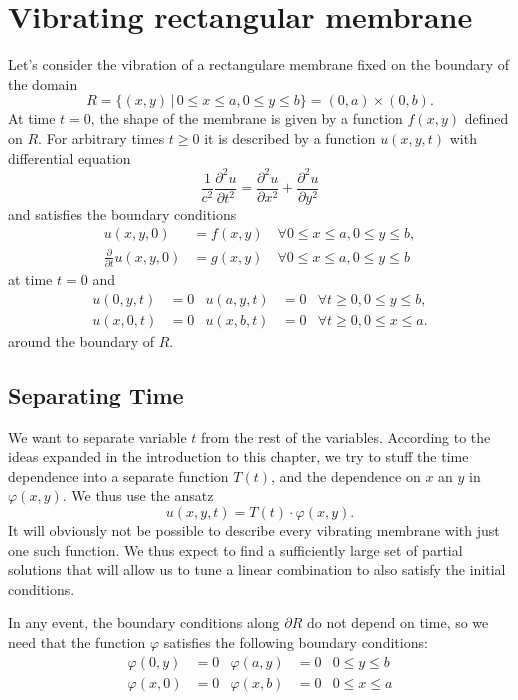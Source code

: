 %
%
%
\section{Vibrating rectangular membrane}
Let's consider the vibration of a rectangulare membrane fixed on
the boundary of the domain
\[
R=\{(x,y)\,|\,0\le x\le a,0\le y\le b\} =(0,a)\times(0,b).
\]
At time $t=0$, the shape of the membrane is given by a function
$f(x,y)$ defined on $R$.
For arbitrary times $t\ge 0$ it is described by a function $u(x,y,t)$ 
with differential equation
\[
\frac1{c^2}\frac{\partial^2u}{\partial t^2}=\frac{\partial^2u}{\partial x^2}+\frac{\partial^2u}{\partial y^2}
\]
and satisfies the boundary conditions
\begin{align*}
u(x,y,0)&=f(x,y)\quad\forall 0\le x\le a,0\le y\le b,
\\
\frac{\partial}{\partial t}u(x,y,0)&=g(x,y)\quad\forall 0\le x\le a,0\le y\le b
\end{align*}
at time $t=0$ and
\begin{align*}
u(0,y,t)&=0&u(a,y,t)&=0&\forall t\ge 0,0\le y\le b,\\
u(x,0,t)&=0&u(x,b,t)&=0&\forall t\ge 0,0\le x\le a.
\end{align*}
around the boundary of $R$.

\subsection{Separating Time
\label{subsection:separating time}
}
We want to separate variable $t$ from the rest of the variables.
According to the ideas expanded in the introduction to this chapter,
we try to stuff the time dependence into a separate function $T(t)$,
and the dependence on $x$ an $y$ in $\varphi(x,y)$.
We thus use the ansatz
\[
u(x,y,t)=T(t)\cdot\varphi(x,y).
\]
It will obviously not be possible to describe every vibrating membrane
with just one such function.
We thus expect to find a sufficiently large set of partial solutions
that will allow us to tune a linear combination to also satisfy the 
initial conditions.


In any event, the boundary conditions along $\partial R$ do not depend
on time, so we need that the function $\varphi$ satisfies the following
boundary conditions:
\begin{align*}
\varphi(0,y)&=0&\varphi(a,y)&=0&0\le y\le b\\
\varphi(x,0)&=0&\varphi(x,b)&=0&0\le x\le a
\end{align*}

